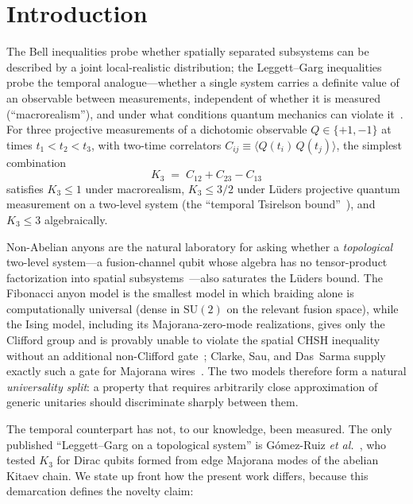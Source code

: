 \documentclass[aps,prx,reprint,amsmath,amssymb,floatfix,nofootinbib,superscriptaddress]{revtex4-2}
\begin{document}
\maketitle

\section{Introduction}

The Bell inequalities probe whether spatially separated subsystems can
be described by a joint local-realistic distribution; the
Leggett--Garg inequalities~\cite{LeggettGarg1985} probe the temporal
analogue---whether a single system carries a definite value of an
observable between measurements, independent of whether it is measured
(``macrorealism''), and under what conditions quantum mechanics can
violate it~\cite{KoflerBrukner2008}. For three projective measurements of a dichotomic
observable $Q \in \{+1,-1\}$ at times $t_{1} < t_{2} < t_{3}$, with
two-time correlators $C_{ij} \equiv \langle Q(t_{i})\,Q(t_{j}) \rangle$,
the simplest combination
\begin{equation}
  K_{3} \;=\; C_{12} + C_{23} - C_{13}
\end{equation}
satisfies $K_{3} \leq 1$ under macrorealism, $K_{3} \leq 3/2$ under
L\"uders projective quantum measurement on a two-level system (the
``temporal Tsirelson bound''~\cite{Budroni2014}), and $K_{3} \leq 3$
algebraically.

Non-Abelian anyons are the natural laboratory for asking whether a
\emph{topological} two-level system---a fusion-channel qubit whose
algebra has no tensor-product factorization into spatial
subsystems~\cite{NayakSimonStern2008}---also saturates the L\"uders
bound. The Fibonacci anyon model is the smallest model in which
braiding alone is computationally universal (dense in $\mathrm{SU}(2)$
on the relevant fusion space), while the Ising model, including its
Majorana-zero-mode realizations, gives only the Clifford group and is
provably unable to violate the spatial CHSH inequality without an
additional non-Clifford gate~\cite{HowardVala2012}; Clarke, Sau, and
Das~Sarma supply exactly such a gate for Majorana
wires~\cite{ClarkeSauDasSarma2016}. The two models
therefore form a natural \emph{universality split}: a property that
requires arbitrarily close approximation of generic unitaries should
discriminate sharply between them.

The temporal counterpart has not, to our knowledge, been measured. The only published
``Leggett--Garg on a topological system'' is G\'omez-Ruiz
\emph{et al.}~\cite{GomezRuiz2018}, who tested $K_{3}$ for Dirac
qubits formed from edge Majorana modes of the abelian Kitaev chain.
We state up front how the present work differs, because this
demarcation defines the novelty claim:
\end{document}
